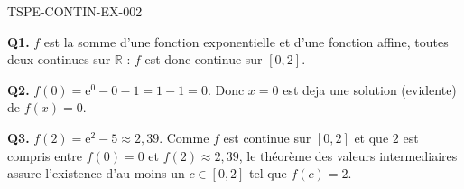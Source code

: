 \begin{corrige}{TSPE-CONTIN-EX-002}

\textbf{Q1.} $f$ est la somme d'une fonction exponentielle et d'une fonction affine, toutes deux continues sur $\mathbb{R}$ : $f$ est donc continue sur $[0,2]$.

\textbf{Q2.} $f(0) = \mathrm{e}^0 - 0 - 1 = 1 - 1 = 0$. Donc $x=0$ est deja une solution (evidente) de $f(x)=0$.

\textbf{Q3.} $f(2) = \mathrm{e}^2 - 5 \approx 2{,}39$. Comme $f$ est continue sur $[0,2]$ et que $2$ est compris entre $f(0)=0$ et $f(2)\approx 2{,}39$, le théorème des valeurs intermediaires assure l'existence d'au moins un $c \in [0,2]$ tel que $f(c) = 2$.

\end{corrige}
